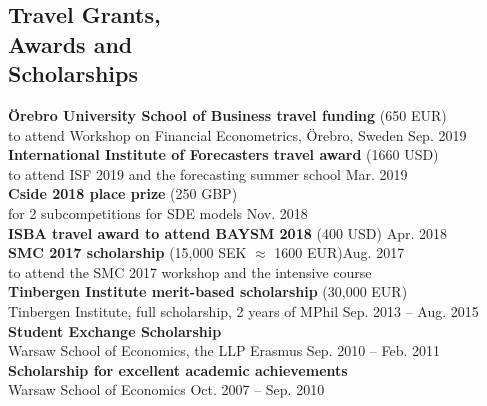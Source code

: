 \documentclass[margin,line]{resume}
\begin{document}
\begin{resume}
\section{\mysidestyle Travel Grants,\\Awards and \\ Scholarships}	
   	\textbf{\"{O}rebro University School of Business travel funding} (650 EUR) \\
    to attend Workshop on Financial Econometrics, \"{O}rebro, Sweden
   	\hfill Sep. 2019 \vspace{1.5mm} \\    	\textbf{International Institute of Forecasters travel award} (1660 USD)\\
    to attend ISF 2019 and the forecasting summer school%
   	\hfill Mar. 2019 \vspace{1.5mm} \\ 
   	\textbf{Cside 2018  place  prize} (250 GBP) \\
   	for 2 subcompetitions for SDE models%
   	 \hfill Nov. 2018 \vspace{1.5mm} \\ 
   	\textbf{ISBA travel award to attend BAYSM 2018} (400 USD)  \hfill Apr. 2018 \vspace{1.5mm} \\ %
   	\textbf{SMC 2017 scholarship} (15,000 SEK $\approx$ 1600 EUR)\hfill Aug. 2017  \\  to attend the SMC 2017 workshop and the intensive course \vspace{1.5mm}\\ %
\newpage
   	\textbf{Tinbergen Institute merit-based scholarship} (30,000 EUR) \\ 
   	Tinbergen Institute, full scholarship, 2 years of MPhil%
   	\hfill Sep. 2013 -- Aug. 2015\vspace{1.5mm} \\   	   	
       \textbf{Student Exchange Scholarship}\\  Warsaw School of Economics, the LLP Erasmus \hfill Sep. 2010 -- Feb. 2011\vspace{1.5mm} \\
       \textbf{Scholarship for excellent academic achievements}\\ Warsaw School of Economics \hfill Oct. 2007 -- Sep. 2010 
       

\end{resume}
\end{document}
